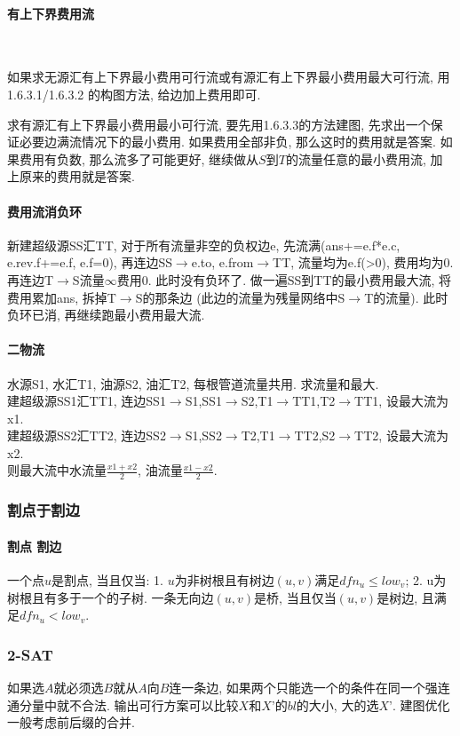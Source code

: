 	\paragraph{有上下界费用流}\
	\par 如果求无源汇有上下界最小费用可行流或有源汇有上下界最小费用最大可行流, 用1.6.3.1/1.6.3.2 的构图方法, 给边加上费用即可. 
	\par 求有源汇有上下界最小费用最小可行流, 要先用1.6.3.3的方法建图, 先求出一个保证必要边满流情况下的最小费用. 如果费用全部非负, 那么这时的费用就是答案. 如果费用有负数, 那么流多了可能更好, 继续做从$S$到$T$的流量任意的最小费用流, 加上原来的费用就是答案. 
	\paragraph{费用流消负环}
	\par 新建超级源SS汇TT, 对于所有流量非空的负权边e, 先流满(ans+=e.f*e.c, e.rev.f+=e.f, e.f=0), 再连边SS$\to$e.to, e.from$\to$TT, 流量均为e.f(>0), 费用均为0. 再连边T$\to$S流量$\infty$费用0. 此时没有负环了. 做一遍SS到TT的最小费用最大流, 将费用累加ans, 拆掉T$\to$S的那条边 (此边的流量为残量网络中S$\to$T的流量). 此时负环已消, 再继续跑最小费用最大流.
	\paragraph{二物流}
	\par 水源S1, 水汇T1, 油源S2, 油汇T2, 每根管道流量共用. 求流量和最大.\\
	建超级源SS1汇TT1, 连边SS1$\to$S1,SS1$\to$S2,T1$\to$TT1,T2$\to$TT1, 设最大流为x1.\\
	建超级源SS2汇TT2, 连边SS2$\to$S1,SS2$\to$T2,T1$\to$TT2,S2$\to$TT2, 设最大流为x2.\\
	则最大流中水流量$\frac{x1+x2}{2}$, 油流量$\frac{x1-x2}{2}$.

\subsubsection{割点于割边}
        \paragraph{割点 割边} 一个点$u$是割点, 当且仅当: 1. $u$为非树根且有树边$(u,v)$满足$dfn_u\leq low_v$; 2. u为树根且有多于一个的子树. 一条无向边$(u,v)$是桥, 当且仅当$(u,v)$是树边, 且满足$dfn_u<low_v$. 

\subsubsection{2-SAT}
    如果选$A$就必须选$B$就从$A$向$B$连一条边, 如果两个只能选一个的条件在同一个强连通分量中就不合法. 输出可行方案可以比较$X$和$X’$的$bl$的大小, 大的选$X’$. 建图优化一般考虑前后缀的合并. 

